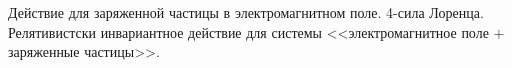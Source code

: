 \documentclass[__main__.tex]{subfiles}
\begin{document}
Действие для заряженной частицы в электромагнитном поле. 4-сила Лоренца. Релятивистски инвариантное действие для системы <<электромагнитное поле + заряженные частицы>>.\\ 

\end{document}
